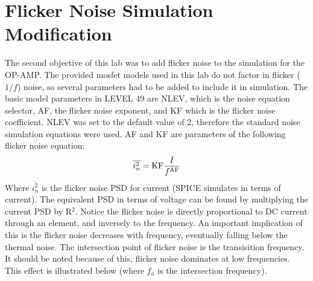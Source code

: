 \documentclass[12pt]{article}
\begin{document}
\section{Flicker Noise Simulation Modification}
The second objective of this lab was to add flicker noise to the simulation for the OP-AMP. The provided mosfet models used in this lab do not factor in flicker ($1/f$) noise, so several parameters had to be added to include it in simulation. The basic model parameters in LEVEL 49 are NLEV, which is the noise equation selector, AF, the flicker noise exponent, and KF which is the flicker noise coefficient. NLEV was set to the default value of 2, therefore the standard noise simulation equations were used. AF and KF are parameters of the following flicker noise equation:
\begin{equation}
\overline{i_n^2} = \textnormal{KF} \frac{I}{f^\textnormal{AF}}
\end{equation}
Where $\overline{i_n^2}$ is the flicker noise PSD for current (SPICE simulates in terms of current). The equivalent PSD in terms of voltage can be found by multiplying the current PSD by R$^2$. Notice the flicker noise is directly proportional to DC current through an element, and inversely to the frequency. An important implication of this is the flicker noise decreases with frequency, eventually falling below the thermal noise. The intersection point of flicker noise is the transisition frequency. It should be noted because of this, flicker noise dominates at low frequencies. This effect is illustrated below (where $f_a$ is the intersection frequency).
\end{document}

